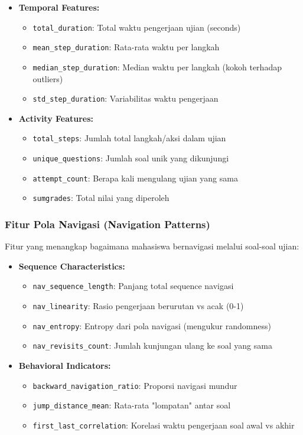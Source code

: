 \begin{itemize}
    \item \textbf{Temporal Features:}
    \begin{itemize}
        \item \texttt{total\_duration}: Total waktu pengerjaan ujian (seconds)
        \item \texttt{mean\_step\_duration}: Rata-rata waktu per langkah
        \item \texttt{median\_step\_duration}: Median waktu per langkah (kokoh terhadap outliers)
        \item \texttt{std\_step\_duration}: Variabilitas waktu pengerjaan
    \end{itemize}
    
    \item \textbf{Activity Features:}
    \begin{itemize}
        \item \texttt{total\_steps}: Jumlah total langkah/aksi dalam ujian
        \item \texttt{unique\_questions}: Jumlah soal unik yang dikunjungi
        \item \texttt{attempt\_count}: Berapa kali mengulang ujian yang sama
        \item \texttt{sumgrades}: Total nilai yang diperoleh
    \end{itemize}
\end{itemize}

\subsubsection{Fitur Pola Navigasi (Navigation Patterns)}
\label{sec:fiturPolaNavigasi}

Fitur yang menangkap bagaimana mahasiswa bernavigasi melalui soal-soal ujian:

\begin{itemize}
    \item \textbf{Sequence Characteristics:}
    \begin{itemize}
        \item \texttt{nav\_sequence\_length}: Panjang total sequence navigasi
        \item \texttt{nav\_linearity}: Rasio pengerjaan berurutan vs acak (0-1)
        \item \texttt{nav\_entropy}: Entropy dari pola navigasi (mengukur randomness)
        \item \texttt{nav\_revisits\_count}: Jumlah kunjungan ulang ke soal yang sama
    \end{itemize}
    
    \item \textbf{Behavioral Indicators:}
    \begin{itemize}
        \item \texttt{backward\_navigation\_ratio}: Proporsi navigasi mundur
        \item \texttt{jump\_distance\_mean}: Rata-rata "lompatan" antar soal
        \item \texttt{first\_last\_correlation}: Korelasi waktu pengerjaan soal awal vs akhir
    \end{itemize}
\end{itemize}

